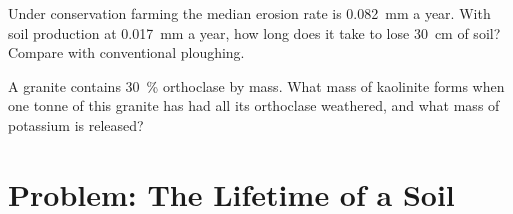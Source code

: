 \begin{exercise}[$\star\star\star$]\label{exo:g10:soil-formation:14}
Under conservation farming the median erosion rate is \qty{0.082}{mm} a
year. With soil production at \qty{0.017}{mm} a year, how long does it take
to lose \qty{30}{cm} of soil? Compare with conventional ploughing.
\end{exercise}

\begin{exercise}[$\star\star\star$]\label{exo:g10:soil-formation:15}
A granite contains \qty{30}{\percent} orthoclase by mass. What mass of
kaolinite forms when one tonne of this granite has had all its orthoclase
weathered, and what mass of potassium is released?
\end{exercise}

\section{Problem: The Lifetime of a Soil}

